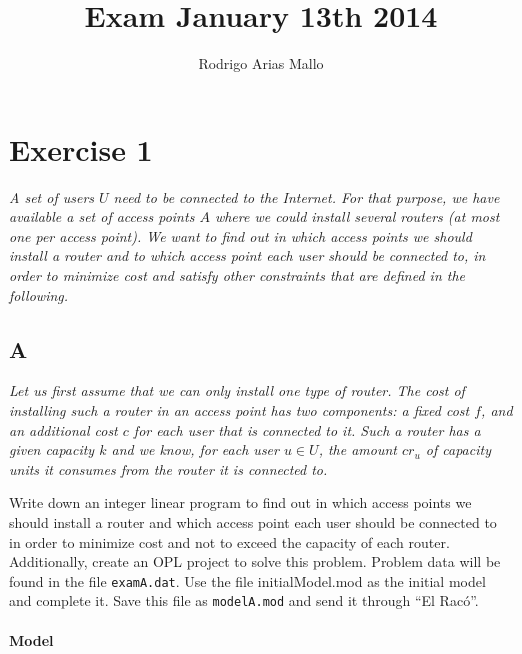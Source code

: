 \documentclass[11pt,a4paper]{article}
\title{Exam January 13th 2014}
\author{Rodrigo Arias Mallo}
\begin{document}
\maketitle

\section*{Exercise 1}

{\sl A set of users $U$ need to be connected to the Internet. For that purpose, 
we have available a set of access points $A$ where we could install several 
routers (at most one per access point). We want to find out in which access 
points we should install a router and to which access point each user should be 
connected to, in order to minimize cost and satisfy other constraints that are 
defined in the following.}

\subsection*{A}

{\sl Let us first assume that we can only install one type of router. The cost 
of installing such a router in an access point has two components: a fixed cost 
$f$, and an additional cost $c$ for each user that is connected to it. Such a 
router has a given capacity $k$ and we know, for each user $u \in U$, the amount 
$cr_u$ of capacity units it consumes from the router it is connected to.

Write down an integer linear program to find out in which access points we 
should install a router and which access point each user should be connected to 
in order to minimize cost and not to exceed the capacity of each router.  
Additionally, create an OPL project to solve this problem. Problem data will be 
found in the file {\tt examA.dat}. Use the file initialModel.mod as the initial 
model and complete it.  Save this file as {\tt modelA.mod} and send it through 
``El Racó''.}

\paragraph*{Model}
\end{document}
